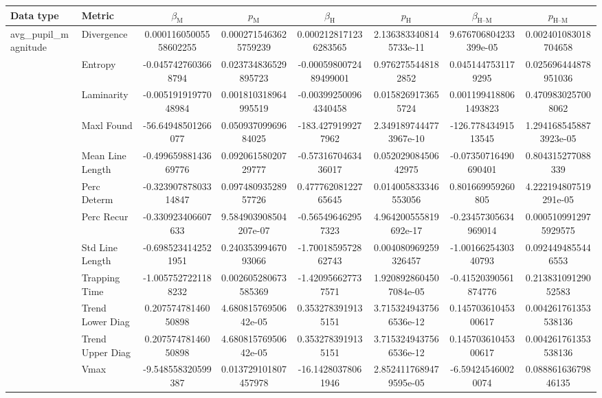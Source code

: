 \begin{tabular}{llcc|cc|cc}
\toprule
Data type & Metric & $\beta_{\text{M}}$ & $p_{\text{M}}$ & $\beta_{\text{H}}$ & $p_{\text{H}}$ & $\beta_{\text{H--M}}$ & $p_{\text{H--M}}$ \\
\midrule
\multirow{12}{*}{avg_pupil_magnitude} & Divergence & 0.00011605005558602255 & 0.0002715463625759239 & 0.0002128171236283565 & 2.1363833408145733e-11 & 9.676706804233399e-05 & 0.002401083018704658 \\
 & Entropy & -0.0457427603668794 & 0.023734836529895723 & -0.0005980072489499001 & 0.9762755448182852 & 0.0451447531179295 & 0.025696444878951036 \\
 & Laminarity & -0.00519191977048984 & 0.001810318964995519 & -0.003992500964340458 & 0.0158269173655724 & 0.0011994188061493823 & 0.4709830257008062 \\
 & Maxl Found & -56.64948501266077 & 0.05093709969684025 & -183.4279199277962 & 2.3491897444773967e-10 & -126.77843491513545 & 1.2941685458873923e-05 \\
 & Mean Line Length & -0.49965988143669776 & 0.09206158020729777 & -0.5731670463436017 & 0.05202908450642975 & -0.07350716490690401 & 0.804315277088339 \\
 & Perc Determ & -0.32390787803314847 & 0.09748093528957726 & 0.47776208122765645 & 0.014005833346553056 & 0.801669959260805 & 4.222194807519291e-05 \\
 & Perc Recur & -0.330923406607633 & 9.584903908504207e-07 & -0.565496462957323 & 4.964200555819692e-17 & -0.23457305634969014 & 0.0005109912975929575 \\
 & Std Line Length & -0.6985234142521951 & 0.24035399467093066 & -1.7001859572862743 & 0.004080969259326457 & -1.0016625430340793 & 0.0924494855446553 \\
 & Trapping Time & -1.0057527221188232 & 0.002605280673585369 & -1.420956627737571 & 1.9208928604507084e-05 & -0.41520390561874776 & 0.21383109129052583 \\
 & Trend Lower Diag & 0.20757478146050898 & 4.68081576950642e-05 & 0.3532783919135151 & 3.7153249437566536e-12 & 0.14570361045300617 & 0.004261761353538136 \\
 & Trend Upper Diag & 0.20757478146050898 & 4.68081576950642e-05 & 0.3532783919135151 & 3.7153249437566536e-12 & 0.14570361045300617 & 0.004261761353538136 \\
 & Vmax & -9.548558320599387 & 0.013729101807457978 & -16.14280378061946 & 2.8524117689479595e-05 & -6.594245460020074 & 0.08886163679846135 \\

\end{tabular}

